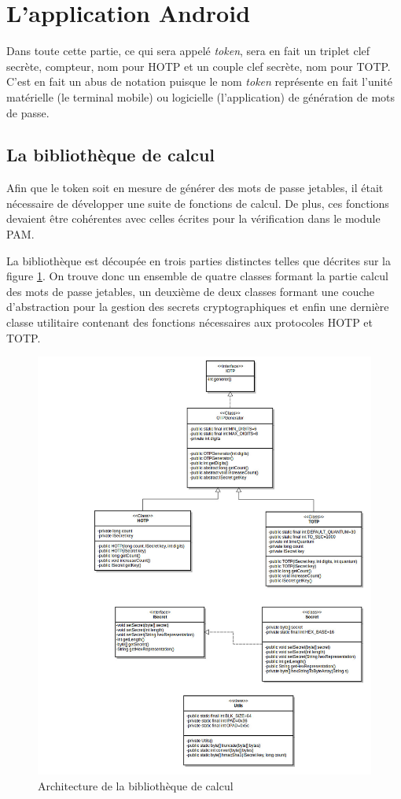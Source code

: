 \section{L'application Android}
Dans toute cette partie, ce qui sera appelé \emph{token}, sera en fait un triplet clef secrète,
compteur, nom pour HOTP et un couple clef secrète, nom pour TOTP. C'est en fait un abus de notation
puisque le nom \emph{token} représente en fait l'unité matérielle (le terminal mobile) ou logicielle
(l'application) de génération de mots de passe.

\subsection{La bibliothèque de calcul}
Afin que le token soit en mesure de générer des mots de passe jetables, il était
nécessaire de développer une suite de fonctions de calcul. De plus, ces fonctions devaient
être cohérentes avec celles écrites pour la vérification dans le module PAM.

La bibliothèque est découpée en trois parties distinctes telles que décrites sur la figure
\ref{fig:umlLib}. On trouve donc un ensemble de quatre classes formant la partie calcul
des mots de passe jetables, un deuxième de deux classes formant une couche d'abstraction
pour la gestion des secrets cryptographiques et enfin une dernière classe utilitaire
contenant des fonctions nécessaires aux protocoles HOTP et TOTP.

\begin{figure}
  \centering
  \includegraphics[scale=0.4]{../graphics/uml_lib.jpg}
  \caption{Architecture de la bibliothèque de calcul}
  \label{fig:umlLib}
\end{figure}


